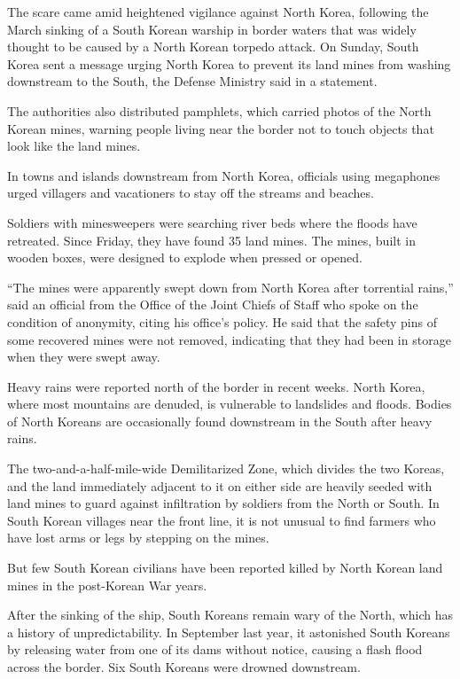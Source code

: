 ﻿\documentclass[12pt]{article}
\begin{document}
The scare came amid heightened vigilance against North Korea, following the March sinking of a South
Korean warship in border waters that was widely thought to be caused by a North Korean torpedo
attack. On Sunday, South Korea sent a message urging North Korea to prevent its land mines from
washing downstream to the South, the Defense Ministry said in a statement.

The authorities also distributed pamphlets, which carried photos of the North Korean mines, warning
people living near the border not to touch objects that look like the land mines.

In towns and islands downstream from North Korea, officials using megaphones urged villagers and
vacationers to stay off the streams and beaches.

Soldiers with minesweepers were searching river beds where the floods have retreated. Since Friday,
they have found 35 land mines. The mines, built in wooden boxes, were designed to explode when
pressed or opened.

``The mines were apparently swept down from North Korea after torrential rains,'' said an official
from the Office of the Joint Chiefs of Staff who spoke on the condition of anonymity, citing his
office's policy. He said that the safety pins of some recovered mines were not removed, indicating
that they had been in storage when they were swept away.

Heavy rains were reported north of the border in recent weeks. North Korea, where most mountains are
denuded, is vulnerable to landslides and floods. Bodies of North Koreans are occasionally found
downstream in the South after heavy rains.

The two-and-a-half-mile-wide Demilitarized Zone, which divides the two Koreas, and the land
immediately adjacent to it on either side are heavily seeded with land mines to guard against
infiltration by soldiers from the North or South. In South Korean villages near the front line, it
is not unusual to find farmers who have lost arms or legs by stepping on the mines.

But few South Korean civilians have been reported killed by North Korean land mines in the
post-Korean War years.

After the sinking of the ship, South Koreans remain wary of the North, which has a history of
unpredictability. In September last year, it astonished South Koreans by releasing water from one of
its dams without notice, causing a flash flood across the border. Six South Koreans were drowned
downstream.
\end{document}
